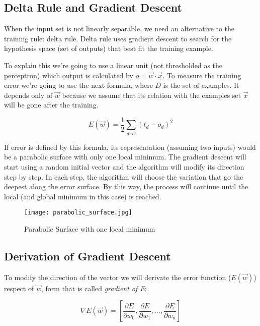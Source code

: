 	\subsection{Delta Rule and Gradient Descent}
	When the input set is not linearly separable, we need an alternative to the training rule: delta rule. Delta rule uses gradient descent to search for the hypothesis space (set of outputs) that best fit the training example. 

	To explain this we’re going to use a linear unit (not thresholded as the perceptron) which output is calculated by $o = \vec{w} \cdot \vec{x}$. To measure the training error we’re going to use the next formula, where $D$ is the set of examples. It depends only of $\vec{w}$ because we assume that its relation with the examples set $\vec{x}$ will be gone after the training.

	\begin{equation}
		\label{error_function_full_square}
		E(\vec{w}) = \frac{1}{2} \sum_{d \varepsilon D} (t_d-o_d)^2 
	\end{equation}

	If error is defined by this formula, its representation (assuming two inputs) would be a parabolic surface with only one local minimum. The gradient descent will start using a random initial vector and the algorithm will modify its direction step by step. In each step, the algorithm will choose the variation that go the deepest along the error surface. By this way, the process will continue until the local (and global minimum in this case) is reached.

	\begin{figure}[ht]
		\centering
		\texttt{[image: parabolic\_surface.jpg]}
		\caption{Parabolic Surface with one local minimum}
	\end{figure}

	\subsection{Derivation of Gradient Descent}
	To modify the direction of the vector we will derivate the error function ($E(\vec{w})$) respect of $\vec{w}$, form that is called \textit{gradient of E}:

	\begin{equation}
		\label{gradient_of_E}
		\nabla E(\vec{w})= [\frac{\partial{E}}{\partial{w_{0}}}, \frac{\partial{E}}{\partial{w_{1}}}, ..., \frac{\partial{E}}{\partial{w_{n}}}]
	\end{equation}


